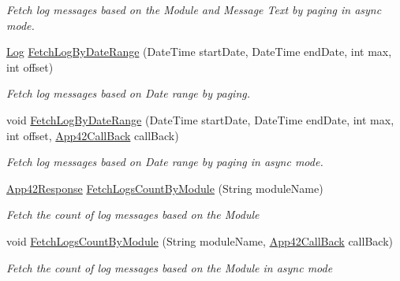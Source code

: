 \begin{DoxyCompactItemize}
\begin{DoxyCompactList}\small\item\em Fetch log messages based on the Module and Message Text by paging in async mode. \end{DoxyCompactList}\item 
\hyperlink{classcom_1_1shephertz_1_1app42_1_1paas_1_1sdk_1_1csharp_1_1log_1_1_log}{Log} \hyperlink{classcom_1_1shephertz_1_1app42_1_1paas_1_1sdk_1_1csharp_1_1log_1_1_log_service_a6e9835c36ebdb5b6fed94593fe148d34}{Fetch\+Log\+By\+Date\+Range} (Date\+Time start\+Date, Date\+Time end\+Date, int max, int offset)
\begin{DoxyCompactList}\small\item\em Fetch log messages based on Date range by paging. \end{DoxyCompactList}\item 
void \hyperlink{classcom_1_1shephertz_1_1app42_1_1paas_1_1sdk_1_1csharp_1_1log_1_1_log_service_a21623028e3035d29eeb6ebbca4e2e19f}{Fetch\+Log\+By\+Date\+Range} (Date\+Time start\+Date, Date\+Time end\+Date, int max, int offset, \hyperlink{interfacecom_1_1shephertz_1_1app42_1_1paas_1_1sdk_1_1csharp_1_1_app42_call_back}{App42\+Call\+Back} call\+Back)
\begin{DoxyCompactList}\small\item\em Fetch log messages based on Date range by paging in async mode. \end{DoxyCompactList}\item 
\hyperlink{classcom_1_1shephertz_1_1app42_1_1paas_1_1sdk_1_1csharp_1_1_app42_response}{App42\+Response} \hyperlink{classcom_1_1shephertz_1_1app42_1_1paas_1_1sdk_1_1csharp_1_1log_1_1_log_service_a17cda8a76ec3501d11d84f3a2b274334}{Fetch\+Logs\+Count\+By\+Module} (String module\+Name)
\begin{DoxyCompactList}\small\item\em Fetch the count of log messages based on the Module \end{DoxyCompactList}\item 
void \hyperlink{classcom_1_1shephertz_1_1app42_1_1paas_1_1sdk_1_1csharp_1_1log_1_1_log_service_a7156674f2c851d3d4af43155c2fbfa32}{Fetch\+Logs\+Count\+By\+Module} (String module\+Name, \hyperlink{interfacecom_1_1shephertz_1_1app42_1_1paas_1_1sdk_1_1csharp_1_1_app42_call_back}{App42\+Call\+Back} call\+Back)
\begin{DoxyCompactList}\small\item\em Fetch the count of log messages based on the Module in async mode \end{DoxyCompactList}\item 

\end{DoxyCompactItemize}
